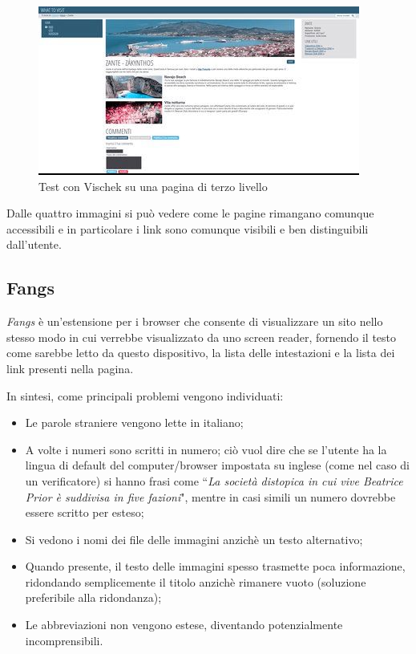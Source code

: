 \begin{figure}[H]
\begin{minipage}{0.45\textwidth}
\end{minipage}
\hspace{\fill}
\begin{minipage}{0.45\textwidth}
\includegraphics[width=\linewidth]{images/screen/tritanope.jpg}
\end{minipage}
\caption{Test con Vischek su una pagina di terzo livello}\label{multiavp}
\end{figure}

Dalle quattro immagini si può vedere come le pagine rimangano comunque accessibili e
in particolare i link sono comunque visibili e ben distinguibili dall'utente.

\subsection{Fangs}\label{sec:fangs} %
\textit{Fangs} è un'estensione per i browser che consente di visualizzare un
sito nello stesso modo in cui verrebbe visualizzato da uno screen reader,
fornendo il testo come sarebbe letto da questo dispositivo, la lista delle
intestazioni e la lista dei link presenti nella pagina.

In sintesi, come principali problemi vengono individuati:
\begin{itemize}
\item Le parole straniere vengono lette in italiano;
\item A volte i numeri sono scritti in numero; ciò vuol dire che se l'utente
ha la lingua di default del computer/browser impostata su inglese (come nel
caso di un verificatore) si hanno frasi come ``\textit{La società distopica in
cui vive Beatrice Prior è suddivisa in five fazioni}", mentre in casi simili
un numero dovrebbe essere scritto per esteso;
\item Si vedono i nomi dei file delle immagini anzichè un testo alternativo;
\item Quando presente, il testo delle immagini spesso trasmette poca
informazione, ridondando semplicemente il titolo anzichè rimanere vuoto
(soluzione preferibile alla ridondanza);
\item Le abbreviazioni non vengono estese, diventando potenzialmente
incomprensibili.
\end{itemize}

